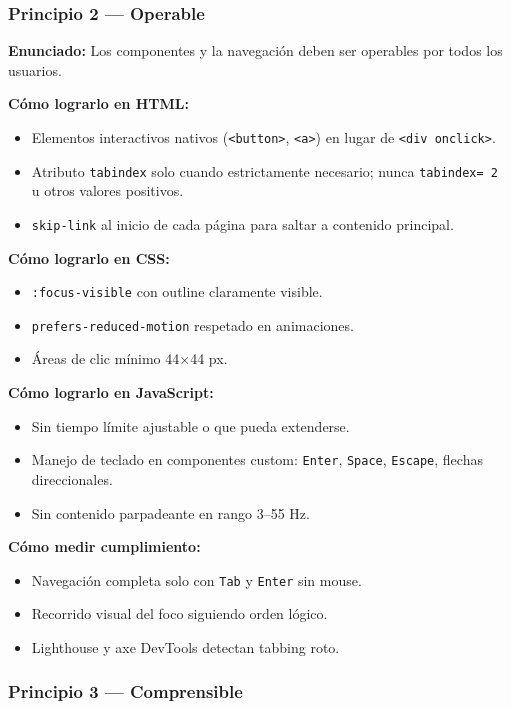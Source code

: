\subsubsection{Principio 2 --- Operable}

\textbf{Enunciado:} Los componentes y la navegación deben ser
operables por todos los usuarios.

\textbf{Cómo lograrlo en HTML:}
\begin{itemize}
\item Elementos interactivos nativos (\texttt{<button>},
\texttt{<a>}) en lugar de \texttt{<div onclick>}.
\item Atributo \texttt{tabindex} solo cuando estrictamente necesario;
nunca \texttt{tabindex= 2 } u otros valores positivos.
\item \texttt{skip-link} al inicio de cada página para saltar a
contenido principal.
\end{itemize}

\textbf{Cómo lograrlo en CSS:}
\begin{itemize}
\item \texttt{:focus-visible} con outline claramente visible.
\item \texttt{prefers-reduced-motion} respetado en animaciones.
\item Áreas de clic mínimo 44$\times$44 px.
\end{itemize}

\textbf{Cómo lograrlo en JavaScript:}
\begin{itemize}
\item Sin tiempo límite ajustable o que pueda extenderse.
\item Manejo de teclado en componentes custom: \texttt{Enter},
\texttt{Space}, \texttt{Escape}, flechas direccionales.
\item Sin contenido parpadeante en rango 3--55 Hz.
\end{itemize}

\textbf{Cómo medir cumplimiento:}
\begin{itemize}
\item Navegación completa solo con \texttt{Tab} y \texttt{Enter} sin
mouse.
\item Recorrido visual del foco siguiendo orden lógico.
\item Lighthouse y axe DevTools detectan tabbing roto.
\end{itemize}

\subsubsection{Principio 3 --- Comprensible}

